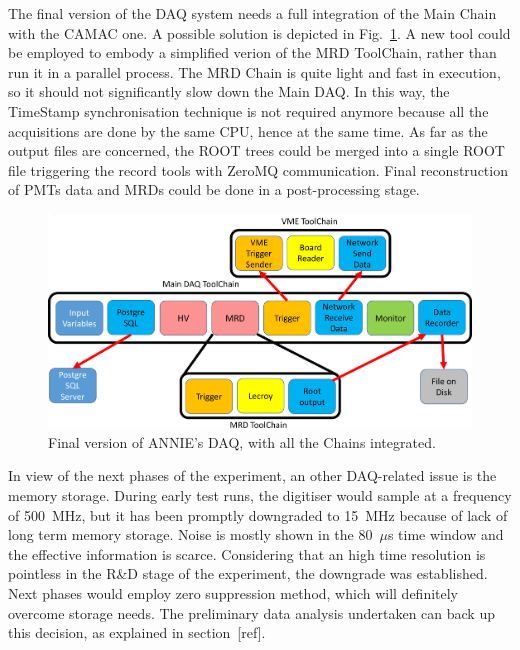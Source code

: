The final version of the DAQ system needs a full integration of the Main Chain with the %
CAMAC one.
A possible solution is depicted in Fig.~\ref{fig:daqcomplete}.
A new tool could be employed to embody a simplified verion of the MRD ToolChain, rather than %
run it in a parallel process.
The MRD Chain is quite light and fast in execution, so it should not %
significantly slow down the Main DAQ.
In this way, the TimeStamp synchronisation technique is not required anymore because all the %
acquisitions are done by the same CPU, hence at the same time.
As far as the output files are concerned, the ROOT trees could be merged into a single ROOT file %
triggering the record tools with ZeroMQ communication.
Final reconstruction of PMTs data and MRDs could be done in a post-processing stage.

\begin{figure}[]
  \centering
  \includegraphics[scale=0.17]{pics/pag5richardshkmeeting}
  \caption{Final version of ANNIE's DAQ, with all the Chains integrated.}
  \label{fig:daqcomplete}
\end{figure}

In view of the next phases of the experiment, an other DAQ-related issue is the memory storage.
During early test runs, the digitiser would sample at a frequency of 500~MHz, but it has been %
promptly downgraded to 15~MHz because of lack of long term memory storage.
Noise is mostly shown in the 80~$\mu$s time window and the effective information is scarce.
Considering that an high time resolution is pointless in the R\&D stage of the experiment, the %
downgrade was established.
Next phases would employ zero suppression method, which will definitely overcome storage needs.
The preliminary data analysis undertaken can back up this decision, as explained in section~[ref].
